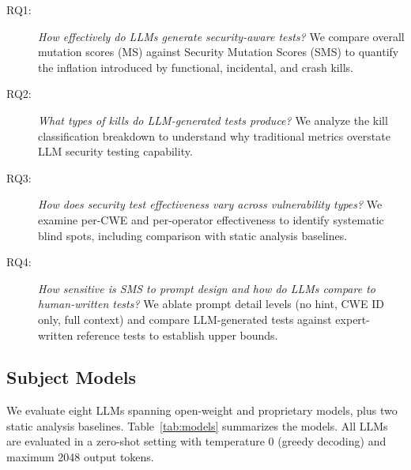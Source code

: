 \documentclass[sigconf,anonymous,review]{acmart}
\begin{document}
\begin{description}
    \item[RQ1:] \textit{How effectively do LLMs generate security-aware tests?} We compare overall mutation scores (MS) against Security Mutation Scores (SMS) to quantify the inflation introduced by functional, incidental, and crash kills.

    \item[RQ2:] \textit{What types of kills do LLM-generated tests produce?} We analyze the kill classification breakdown to understand why traditional metrics overstate LLM security testing capability.

    \item[RQ3:] \textit{How does security test effectiveness vary across vulnerability types?} We examine per-CWE and per-operator effectiveness to identify systematic blind spots, including comparison with static analysis baselines.


    \item[RQ4:] \textit{How sensitive is SMS to prompt design and how do LLMs compare to human-written tests?} We ablate prompt detail levels (no hint, CWE ID only, full context) and compare LLM-generated tests against expert-written reference tests to establish upper bounds. 

\end{description}


\subsection{Subject Models}

We evaluate eight LLMs spanning open-weight and proprietary models, plus two static analysis baselines. Table~\ref{tab:models} summarizes the models. All LLMs are evaluated in a zero-shot setting with temperature 0 (greedy decoding) and maximum 2048 output tokens.
\end{document}

